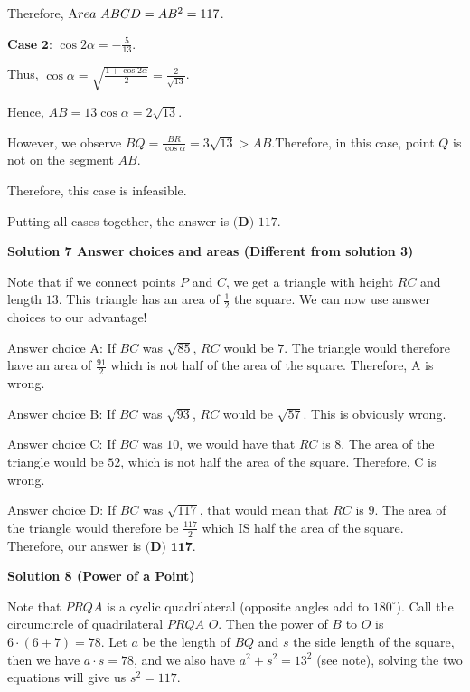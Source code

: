 \begin{enumerate}
 Therefore, ${\textrm Area} \ ABCD = AB^2 = 117$.

 $\textbf{Case 2}$: $\cos 2 \alpha = - \frac{5}{13}$.

 Thus, $\cos \alpha = \sqrt{\frac{1 + \cos 2 \alpha}{2}} = \frac{2}{\sqrt{13}}$.

 Hence, $AB = 13 \cos \alpha = 2 \sqrt{13}$.

 However, we observe $BQ = \frac{BR}{\cos \alpha} = 3 \sqrt{13} > AB$.Therefore, in this case, point $Q$ is not on the segment $AB$.

 Therefore, this case is infeasible.

 Putting all cases together, the answer is $\boxed{\textbf{(D) }117}$.

 



\textbf{Solution 7 Answer choices and areas (Different from solution 3)}

Note that if we connect points $P$ and $C$, we get a triangle with height $RC$ and length $13$. This triangle has an area of $\frac {1}{2}$ the square. We can now use answer choices to our advantage!

 Answer choice A: If $BC$ was $\sqrt {85}$, $RC$ would be $7$. The triangle would therefore have an area of $\frac {91}{2}$ which is not  half of the area of the square. Therefore, A is wrong.

 Answer choice B: If $BC$ was $\sqrt {93}$, $RC$ would be $\sqrt {57}$. This is obviously wrong.

 Answer choice C: If $BC$ was $10$, we would have that $RC$ is $8$. The area of the triangle would be $52$, which is not half the area of the square. Therefore, C is wrong.

 Answer choice D: If $BC$ was $\sqrt {117}$, that would mean that $RC$ is $9$. The area of the triangle would therefore be $\frac {117}{2}$ which IS half the area of the square. Therefore, our answer is $\boxed {\textbf{(D) 117}}$.

 



\textbf{Solution 8 (Power of a Point)}

Note that $PRQA$ is a cyclic quadrilateral (opposite angles add to $180^{\circ}$). Call the circumcircle of quadrilateral $PRQA$ $O$. Then the power of $B$ to $O$ is $6\cdot (6+7)=78$. Let $a$ be the length of $BQ$ and $s$ the side length of the square, then we have $a\cdot s = 78$, and we also have $a^2 + s^2=13^2$ (see note), solving the two equations will give us $s^2=117$.


\end{enumerate}
